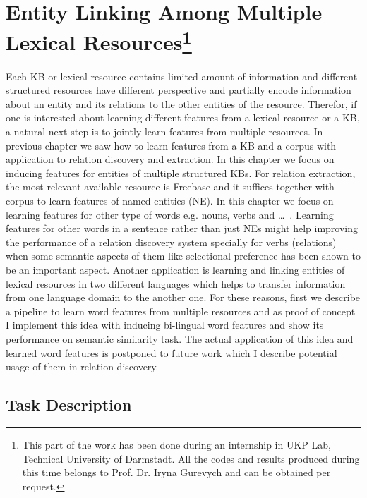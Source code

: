 \chapter[Entity Linking Among Lexical Resources]{Entity Linking Among
Multiple Lexical Resources\footnote{This part of the work has been done during
an internship in UKP Lab, Technical University of Darmstadt. All the codes and results produced during this time belongs to Prof. Dr. Iryna Gurevych and can be obtained per
request.}}

\label{ch:ent-link}


Each KB or lexical resource contains limited amount of information and
different structured resources have different perspective and partially encode
information about an entity and its relations to the other entities of the
resource. Therefor, if one is interested about learning different features from
a lexical resource or a KB, a natural next step is to jointly learn features
from multiple resources. In previous chapter we saw how to learn features from
a KB and a corpus with application to relation discovery and extraction. In this
chapter we focus on inducing features for entities of multiple structured KBs.
For relation extraction, the most relevant available resource is Freebase and
it suffices together with corpus to learn features of named entities (NE). In
this chapter we focus on learning features for other type of words e.g. nouns,
verbs and \ldots~. Learning features for other words in a sentence rather than
just NEs might help improving the performance of a relation discovery system
specially for verbs (relations) when some semantic aspects of them like
selectional preference has been shown to be an important aspect. Another
application is learning and linking entities of lexical resources in two
different languages which helps to transfer information from one language domain
to the another one. For these reasons, first we describe a pipeline to learn
word features from multiple resources and as proof of concept I implement this
idea with inducing bi-lingual word features and show its performance
on semantic similarity task. The actual application of this idea and learned
word features is postponed to future work which I describe potential usage of
them in relation discovery.


\section{Task Description}
\label{sec:xkb-task-desc}

